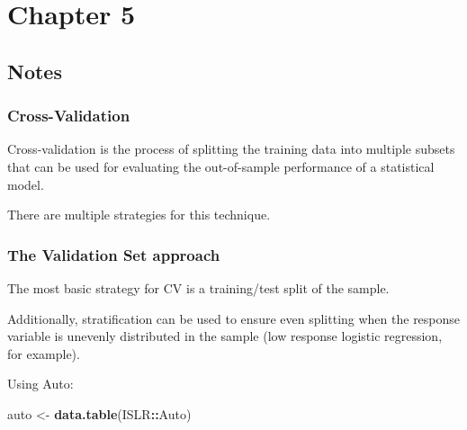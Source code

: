 \documentclass[12pt,]{report}
\author{}
\date{\vspace{-2.5em}20 January, 2020}
\newenvironment{Shaded}{\begin{snugshade}}{\end{snugshade}}
\newcommand{\KeywordTok}[1]{\textcolor[rgb]{0.13,0.29,0.53}{\textbf{#1}}}
\newcommand{\NormalTok}[1]{#1}
\newcommand{\OperatorTok}[1]{\textcolor[rgb]{0.81,0.36,0.00}{\textbf{#1}}}
\newcommand{\StringTok}[1]{\textcolor[rgb]{0.31,0.60,0.02}{#1}}
\begin{document}
\hypertarget{chapter-5}{%
\section{Chapter 5}\label{chapter-5}}

\hypertarget{notes}{%
\subsection{Notes}\label{notes}}

\hypertarget{cross-validation}{%
\subsubsection{Cross-Validation}\label{cross-validation}}

Cross-validation is the process of splitting the training data into
multiple subsets that can be used for evaluating the out-of-sample
performance of a statistical model.

There are multiple strategies for this technique.

\hypertarget{the-validation-set-approach}{%
\subsubsection{The Validation Set
approach}\label{the-validation-set-approach}}

The most basic strategy for CV is a training/test split of the sample.

Additionally, stratification can be used to ensure even splitting when
the response variable is unevenly distributed in the sample (low
response logistic regression, for example).

Using Auto:

\begin{Shaded}
\begin{Highlighting}[]
\NormalTok{auto <-}\StringTok{ }\KeywordTok{data.table}\NormalTok{(ISLR}\OperatorTok{::}\NormalTok{Auto)}
\end{Highlighting}
\end{Shaded}
\end{document}
